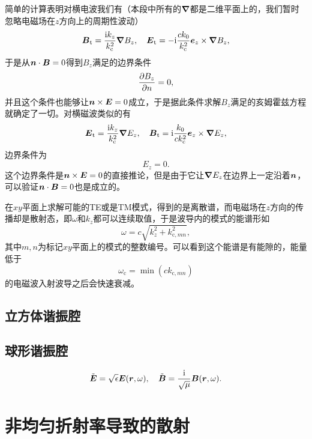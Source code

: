 简单的计算表明对横电波我们有（本段中所有的$\grad$都是二维平面上的，我们暂时忽略电磁场在$z$方向上的周期性波动）
\begin{equation}
    \vb*{B}_\text{t} = \frac{\mathrm{i} k_z}{k_\text{c}^2} \grad{B_z}, \quad \vb*{E}_\text{t} = - \mathrm{i} \frac{c k_0}{k_\text{c}^2} \vb*{e}_z \times \grad{B_z},
\end{equation}
于是从$\vb*{n} \cdot \vb*{B} = 0$得到$B_z$满足的边界条件
\begin{equation}
    \pdv{B_z}{n} = 0,
\end{equation}
并且这个条件也能够让$\vb*{n} \times \vb*{E} = 0$成立，于是据此条件求解$B_z$满足的亥姆霍兹方程就确定了一切。对横磁波类似的有
\begin{equation}
    \vb*{E}_\text{t} = \frac{\mathrm{i} k_z}{k_\text{c}^2} \grad{E_z}, \quad \vb*{B}_\text{t} = \mathrm{i} \frac{k_0}{ck_\text{c}^2} \vb*{e}_z \times \grad{E_z},
\end{equation}
边界条件为
\begin{equation}
    E_z = 0.
\end{equation}
这个边界条件是$\vb*{n} \times \vb*{E}=0$的直接推论，但是由于它让$\grad{E_z}$在边界上一定沿着$\vb*{n}$，可以验证$\vb*{n} \cdot \vb*{B}=0$也是成立的。

在$xy$平面上求解可能的TE或是TM模式，得到的是离散谱，而电磁场在$z$方向的传播却是散射态，即$\omega$和$k_z$都可以连续取值，于是波导内的模式的能谱形如
\begin{equation}
    \omega = c \sqrt{k_z^2 + k_{\text{c}, mn}^2},
\end{equation}
其中$m, n$为标记$xy$平面上的模式的整数编号。可以看到这个能谱是有能隙的，能量低于
\begin{equation}
    \omega_\text{c} = \min (c k_{\text{c}, mn})
\end{equation}
的电磁波入射波导之后会快速衰减。

\section{立方体谐振腔}

\section{球形谐振腔}

\begin{equation}
    \tilde{\vb*{E}} = \sqrt{\epsilon} \vb*{E}(\vb*{r}, \omega), \quad \tilde{\vb*{B}} = \frac{\mathrm{i}}{\sqrt{\mu}} \vb*{B}(\vb*{r}, \omega).
\end{equation}

\chapter{非均匀折射率导致的散射}